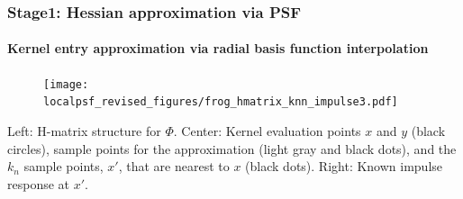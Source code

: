 \documentclass[10pt,final,xcolor=dvipsnames]{beamer}
\newcommand{\Aker}{\Phi}
\begin{document}
\begin{frame}
  \frametitle{Stage1: Hessian approximation via PSF}
\framesubtitle{Kernel entry approximation via radial basis function interpolation}
\begin{figure}
	\centering \texttt{[image: localpsf\_revised\_figures/frog\_hmatrix\_knn\_impulse3.pdf]}
\end{figure}

\begin{center}
  Left: H-matrix structure for $\Aker$. Center: Kernel evaluation
  points $x$ and $y$ (black circles), sample points for the
  approximation (light gray and black dots), and the $k_n$ sample
  points, $x'$, that are nearest to $x$ (black dots). Right: Known
  impulse response at $x'$.
\end{center}

\end{frame}
\end{document}
